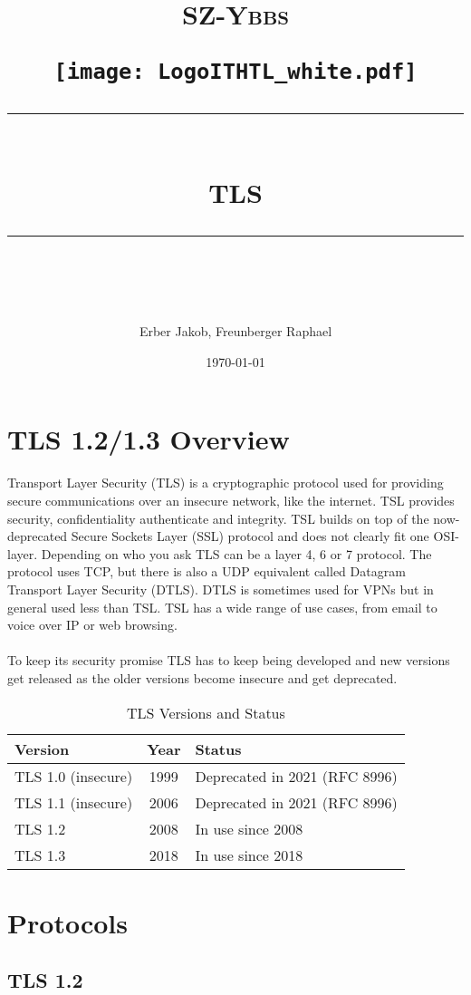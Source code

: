 \documentclass[11pt]{scrartcl} %
\title{	
	\normalfont\normalsize
	\begin{center}
		\begin{minipage}[c]{0.2\textwidth}
			\textsc{\Large SZ-Ybbs}
		\end{minipage}%
		\begin{minipage}[c]{0.1\textwidth}
			\texttt{[image: LogoITHTL\_white.pdf]}
		\end{minipage}
	\end{center}
	\vspace{10pt} %
	\rule{\linewidth}{0.5pt}\\ %
	\vspace{20pt} %
	{\huge TLS}\\ %
	\vspace{12pt} %
	\rule{\linewidth}{2pt}\\ %
	\vspace{12pt} %
}
\author{\LARGE Erber Jakob, Freunberger Raphael} %
\date{\normalsize\today} %
\begin{document}
\maketitle %

\section{TLS 1.2/1.3 Overview}

Transport Layer Security (TLS) is a cryptographic protocol used for providing secure communications over an insecure network, like the internet. TSL provides security, confidentiality authenticate and integrity. TSL builds on top of the now-deprecated Secure Sockets Layer (SSL) protocol and does not clearly fit one OSI-layer. Depending on who you ask TLS can be a layer 4, 6 or 7 protocol. The protocol uses TCP, but there is also a UDP equivalent called Datagram Transport Layer Security (DTLS). DTLS is sometimes used for VPNs but in general used less than TSL. TSL has a wide range of use cases, from email to voice over IP or web browsing.
\\\\
To keep its security promise TLS has to keep being developed and new versions get released as the older versions become insecure and get deprecated.

\begin{table}[h]
    \centering
    \begin{tabular}{|l|c|l|}
        \hline
        \textbf{Version} & \textbf{Year} & \textbf{Status} \\ \hline
        TLS 1.0 (insecure) & 1999 & Deprecated in 2021 (RFC 8996) \\ \hline
        TLS 1.1 (insecure) & 2006 & Deprecated in 2021 (RFC 8996) \\ \hline
        TLS 1.2 & 2008 & In use since 2008 \\ \hline
        TLS 1.3 & 2018 & In use since 2018 \\ \hline
    \end{tabular}
    \caption{TLS Versions and Status}
    \label{tab:tls_versions}
\end{table}



\section{Protocols}

\subsection{TLS 1.2}
\end{document}
